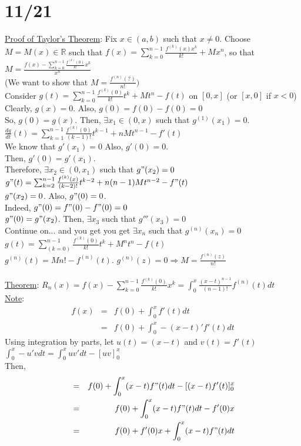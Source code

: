 \documentclass[11pt]{article}
\begin{document}
\section*{11/21}
	\underline{Proof of Taylor's Theorem}: Fix $x \in (a,b)$ such that $x 
	\not= 0$. Choose $M = M(x) \in \mathbb{R}$ such that $f(x) = 
	\sum_{k = 0}^{n - 1} \frac{f^{(k)}(x) x^k}{k!} + Mx^n$, so that
	$M = \frac{f(x) - \sum_{k = 0}^{n-1} \frac{f^{(k)}(0)}{k!} x^k}{x^n}$\\
	(We want to show that $M = \frac{f^{(n)}(?)}{n!})$\\
	Consider $g(t) = \sum_{k = 0}^{n -1}\frac{f^{(k)}(0)}{k!} t^k + Mt^n - 
	f(t)$ on $[0,x]$ (or $[x, 0]$ if $x < 0$)\\
	Clearly, $g(x) = 0$. Also, $g(0) = f(0) - f(0) = 0$\\
	So, $g(0) = g(x)$. Then, $\exists x_1 \in (0, x)$ such that $g^{(1)}(x_1)
	= 0$.\\
	$\frac{dg}{dt}(t) = \sum_{k = 1}^{n-1}\frac{f^{(k)}(0)}{(k-1)!} t^{k - 1}
	+ nMt^{n-1} - f'(t)$\\
	We know that $g'(x_1) = 0$ Also, $g'(0) = 0$.\\
	Then, $g'(0) = g'(x_1)$.\\
	Therefore, $\exists x_2 \in (0, x_1)$ such that $g"(x_2) = 0$\\
	$g"(t) = \sum_{k = 2}^{n - 1} \frac{f^{(k)}(x)}{(k-2)!} t^{k - 2} +
	n(n-1)Mt^{n-2} - f"(t)$\\
	$g"(x_2) = 0$. Also, $g"(0) = 0$.\\
	Indeed, $g"(0) = f"(0) - f"(0) = 0$\\
	$g"(0) = g"(x_2)$. Then, $\exists x_3$ such that $g'''(x_3) = 0$\\
	Continue on... and you get you get $\exists x_n$ such that
	$g^{(n)}(x_n) = 0$\\
	$g(t) = \sum_{(k = 0)}^{n-1} \frac{f^{(k)}(0)}{k!} t^k + M^nt^n - f(t)$\\
	$g^{(n)}(t) = Mn! - f^{(n)}(t)$. $g^{(n)}(z) = 0 \Rightarrow M = 
	\frac{f^{(n)}(z)}{n!}$\\\\
	\underline{Theorem}: $R_n(x) = f(x) - \sum_{k = 0}^{n-1} \frac{f^{(k)}(0)}
	{k!} x^k = \int_0^x \frac{(x-t)^{n-1}}{(n-1)!} f^{(n)}(t)dt$\\
	\underline{Note}: 
	\begin{eqnarray*}
		f(x) & = & f(0) + \int_0^x f'(t)dt\\
		& =& f(0) + \int_0^x -(x-t)' f'(t)dt 
	\end{eqnarray*}
	Using integration by parts, let $u(t) = (x-t)$ and $v(t) = f'(t)$\\
	$\int_0^x -u'vdt = \int_0^x uv'dt - [uv]_0^x$\\
	Then,
	\begin{eqnarray*}
		& = & f(0) + \int_0^x (x-t)f"(t)dt - [(x-t)f'(t)]_0^x\\
		& = & f(0) + \int_0^x (x-t)f"(t)dt - f'(0)x\\
		& = & f(0) + f'(0)x + \int_0^x (x-t)f"(t) dt
	\end{eqnarray*}
\end{document}
